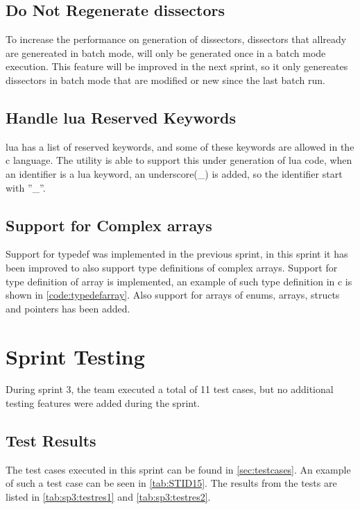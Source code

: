 \subsection{Do Not Regenerate \glspl{dissector}}
To increase the performance on generation of \glspl{dissector}, \glspl{dissector} that 
allready are genereated in \gls{batch mode}, will only be generated once in a batch 
mode execution. This feature will be improved in the next sprint, so it only 
genereates \glspl{dissector} in \gls{batch mode} that are modified or new since the last 
batch run.

\subsection{Handle \Gls{lua} Reserved Keywords}
\Gls{lua} has a list of reserved keywords, and some of these keywords are allowed in 
the \Gls{c} language. The \gls{utility} is able to support this under generation of \Gls{lua} 
code, when an identifier is a lua keyword, an underscore(\_) is added, so the 
identifier start with ''\_''.

\subsection{Support for Complex \Glspl{array}}
Support for typedef was implemented in the previous sprint, in this sprint it 
has been improved to also support type definitions of complex \glspl{array}. Support 
for type definition of array is implemented, an example of such type 
definition in \Gls{c} is shown in \autoref{code:typedefarray}. Also support for 
\glspl{array} of \glspl{enum}, \glspl{array}, \glspl{struct} and pointers has been added.




\section{Sprint Testing}
\label{sec:sp3:test}
During sprint 3, the team executed a total of 11 test cases, but no additional testing features were added during the sprint. 

\subsection{Test Results}
The test cases executed in this sprint can be found in \autoref{sec:testcases}. An example of such a test case can be seen in \autoref{tab:STID15}. The results from the tests are listed in \autoref{tab:sp3:testres1} and \autoref{tab:sp3:testres2}.

